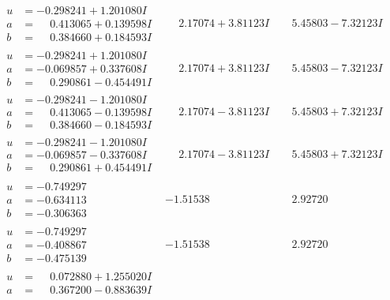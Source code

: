 \documentclass[1p]{elsarticle_modified}
\theoremstyle{definition}
\begin{document}
$$\begin{array}{c|c|c}
\begin{aligned}
u &= -0.298241 + 1.201080 I \\
a &= \phantom{-}0.413065 + 0.139598 I \\
b &= \phantom{-}0.384660 + 0.184593 I\end{aligned}
 & \phantom{-}2.17074 + 3.81123 I & \phantom{-}5.45803 - 7.32123 I \\ \hline\begin{aligned}
u &= -0.298241 + 1.201080 I \\
a &= -0.069857 + 0.337608 I \\
b &= \phantom{-}0.290861 - 0.454491 I\end{aligned}
 & \phantom{-}2.17074 + 3.81123 I & \phantom{-}5.45803 - 7.32123 I \\ \hline\begin{aligned}
u &= -0.298241 - 1.201080 I \\
a &= \phantom{-}0.413065 - 0.139598 I \\
b &= \phantom{-}0.384660 - 0.184593 I\end{aligned}
 & \phantom{-}2.17074 - 3.81123 I & \phantom{-}5.45803 + 7.32123 I \\ \hline\begin{aligned}
u &= -0.298241 - 1.201080 I \\
a &= -0.069857 - 0.337608 I \\
b &= \phantom{-}0.290861 + 0.454491 I\end{aligned}
 & \phantom{-}2.17074 - 3.81123 I & \phantom{-}5.45803 + 7.32123 I \\ \hline\begin{aligned}
u &= -0.749297\phantom{ +0.000000I} \\
a &= -0.634113\phantom{ +0.000000I} \\
b &= -0.306363\phantom{ +0.000000I}\end{aligned}
 & -1.51538\phantom{ +0.000000I} & \phantom{-}2.92720\phantom{ +0.000000I} \\ \hline\begin{aligned}
u &= -0.749297\phantom{ +0.000000I} \\
a &= -0.408867\phantom{ +0.000000I} \\
b &= -0.475139\phantom{ +0.000000I}\end{aligned}
 & -1.51538\phantom{ +0.000000I} & \phantom{-}2.92720\phantom{ +0.000000I} \\ \hline\begin{aligned}
u &= \phantom{-}0.072880 + 1.255020 I \\
a &= \phantom{-}0.367200 - 0.883639 I \\

\end{aligned}
\end{array}$$
\end{document}
